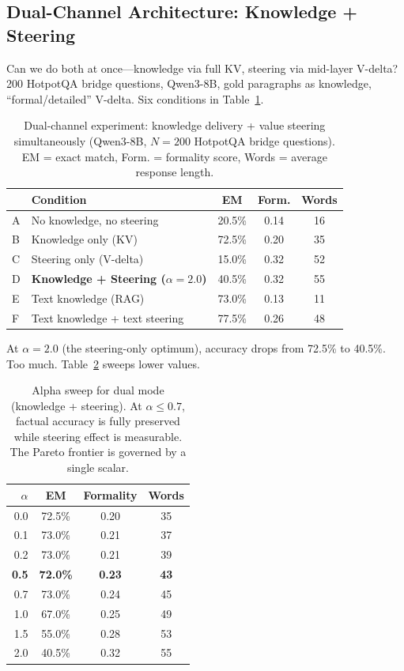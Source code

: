\documentclass{article}
\begin{document}
\subsection{Dual-Channel Architecture: Knowledge + Steering}
\label{sec:dual}

Can we do both at once---knowledge via full KV, steering via mid-layer V-delta? 200 HotpotQA bridge questions, Qwen3-8B, gold paragraphs as knowledge, ``formal/detailed'' V-delta. Six conditions in Table~\ref{tab:dual}.

\begin{table}[t]
\centering
\caption{Dual-channel experiment: knowledge delivery + value steering simultaneously (Qwen3-8B, $N{=}200$ HotpotQA bridge questions). EM = exact match, Form. = formality score, Words = average response length.}
\label{tab:dual}
\begin{tabular}{llccc}
\toprule
& \textbf{Condition} & \textbf{EM} & \textbf{Form.} & \textbf{Words} \\
\midrule
A & No knowledge, no steering & 20.5\% & 0.14 & 16 \\
B & Knowledge only (KV) & 72.5\% & 0.20 & 35 \\
C & Steering only (V-delta) & 15.0\% & 0.32 & 52 \\
D & \textbf{Knowledge + Steering ($\alpha{=}2.0$)} & 40.5\% & 0.32 & 55 \\
E & Text knowledge (RAG) & 73.0\% & 0.13 & 11 \\
F & Text knowledge + text steering & 77.5\% & 0.26 & 48 \\
\bottomrule
\end{tabular}
\end{table}

At $\alpha{=}2.0$ (the steering-only optimum), accuracy drops from 72.5\% to 40.5\%. Too much. Table~\ref{tab:dual_alpha} sweeps lower values.

\begin{table}[t]
\centering
\caption{Alpha sweep for dual mode (knowledge + steering). At $\alpha{\leq}0.7$, factual accuracy is fully preserved while steering effect is measurable. The Pareto frontier is governed by a single scalar.}
\label{tab:dual_alpha}
\begin{tabular}{rccc}
\toprule
$\alpha$ & \textbf{EM} & \textbf{Formality} & \textbf{Words} \\
\midrule
0.0 & 72.5\% & 0.20 & 35 \\
0.1 & 73.0\% & 0.21 & 37 \\
0.2 & 73.0\% & 0.21 & 39 \\
\textbf{0.5} & \textbf{72.0\%} & \textbf{0.23} & \textbf{43} \\
0.7 & 73.0\% & 0.24 & 45 \\
1.0 & 67.0\% & 0.25 & 49 \\
1.5 & 55.0\% & 0.28 & 53 \\
2.0 & 40.5\% & 0.32 & 55 \\
\bottomrule
\end{tabular}
\end{table}
\end{document}
